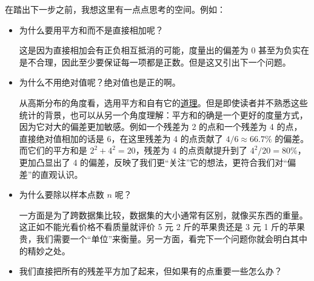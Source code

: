 \documentclass[UTF8, 12pt]{article}
\newcommand{\uhref}[2]{\href{#1}{\underline{#2}}}
\begin{document}
在踏出下一步之前，我想这里有一点点思考的空间。例如：
\begin{itemize}
    \item 为什么要用平方和而不是直接相加呢？

          这是因为直接相加会有正负相互抵消的可能，度量出的偏差为 0 甚至为负实在是不合理，因此至少要保证每一项都是正数。但是这又引出下一个问题。

    \item 为什么不用绝对值呢？绝对值也是正的啊。

          从高斯分布的角度看，选用平方和自有它的\uhref{https://www.zhihu.com/question/20447622/answer/25186207}{道理}。但是即使读者并不熟悉这些统计的背景，也可以从另一个角度理解：平方和的确是一个更好的度量方式，因为它对大的偏差更加敏感。例如一个残差为 2 的点和一个残差为 4 的点，直接绝对值相加的话是 6，在这里残差为 4 的点贡献了 $4 / 6 \approx 66.7\%$ 的偏差。而它们的平方和是 $2^2 + 4^2 = 20$，残差为 4 的点贡献提升到了 $4^2 / 20 = 80\%$，更加凸显出了 4 的偏差，反映了我们更“关注”它的想法，更符合我们对“偏差”的直观认识。

    \item 为什么要除以样本点数 $n$ 呢？

          一方面是为了跨数据集比较，数据集的大小通常有区别，就像买东西的重量。这正如不能光看价格不看质量就评价 5 元 2 斤的苹果贵还是 3 元 1 斤的苹果贵，我们需要一个“单位”来衡量。另一方面，看完下一个问题你就会明白其中的精妙之处。

    \item 我们直接把所有的残差平方加了起来，但如果有的点重要一些怎么办？


\end{itemize}
\end{document}
